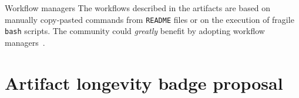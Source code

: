 \documentclass[sigconf,natbib=false]{acmart}
\newcommand{\eg}{\emph{e.g.,}}
\newcommand{\todo}[1]{{\color{red}{TODO: #1}}}
\newcommand{\fmc}[1]{{\color{magenta} #1}} %
\begin{document}
%

\begin{lesson}{Workflow managers}{}
  The workflows described in the artifacts are based on manually copy-pasted commands from \texttt{README} files or on the execution of fragile \texttt{bash} scripts.
  The community could \emph{greatly} benefit by adopting workflow managers\ \cite{wratten2021reproducible}.
\end{lesson}

% 

%
\section{Artifact longevity badge proposal}\label{sec:longevity}
\end{document}
